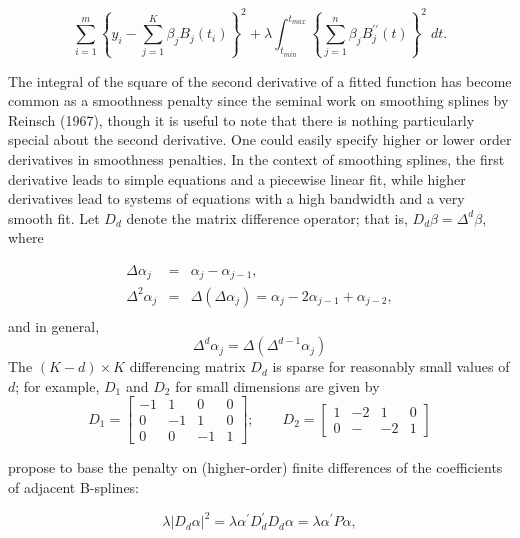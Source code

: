 \documentclass[12pt]{article}
\theoremstyle{definition}
\begin{document}
\begin{equation} \label{eq:univariate_bspline_ridge_penalty}
\sum_{i=1}^m \left \{ y_i - \sum_{j=1}^K \beta_j B_j\left(t_i\right) \right \}^2 + \lambda \int_{t_{min}}^{t_{max}} \left\{  \sum_{j=1}^n \beta_j B^{\prime \prime}_j\left(t\right) \right\}^2 \; dt.
\end{equation}

The integral of the square of the second derivative of a fitted function has become common as a smoothness penalty since the seminal work on smoothing splines by Reinsch (1967), though it is useful to note that there is nothing particularly special about the second derivative. One could easily specify higher or lower order derivatives in smoothness penalties. In the context of smoothing splines, the first derivative leads to simple equations and a piecewise linear fit, while higher derivatives lead to systems of equations with a high bandwidth and a very smooth fit. Let $D_d$ denote the matrix difference operator; that is, $D_d\beta = \Delta^d \beta$, where

 \begin{eqnarray*}
 \Delta \alpha_j &=& \alpha_j - \alpha_{j-1},\\
 \Delta^2 \alpha_j &=& \Delta\left(\Delta \alpha_j\right) = \alpha_j - 2\alpha_{j-1} + \alpha_{j-2},\\ 
 \end{eqnarray*}
\noindent 
and in general,
\begin{equation*}
\Delta^d \alpha_j = \Delta\left(\Delta^{d-1} \alpha_j \right)
\end{equation*}
The $\left(K - d\right) \times K$ differencing matrix $D_d$ is sparse for reasonably small values of $d$; for example, $D_1$ and $D_2$ for small dimensions are given by 
\[
D_1 = \begin{bmatrix} -1&1&0&0\\ 0&-1&1&0\\ 0&0&-1&1 \end{bmatrix}; \qquad D_2 = \begin{bmatrix} 1&-2&1&0 \\ 0&-&-2&1\end{bmatrix}
\]

\cite{eilers1996flexible} propose to base the penalty on (higher-order) finite differences of the coefficients of adjacent B-splines:

 \[
 \lambda\vert D_d\alpha\vert^2 = \lambda \alpha^\prime D^\prime_d D_d \alpha = \lambda \alpha^\prime P\alpha,
 \] 
 
\end{document}

